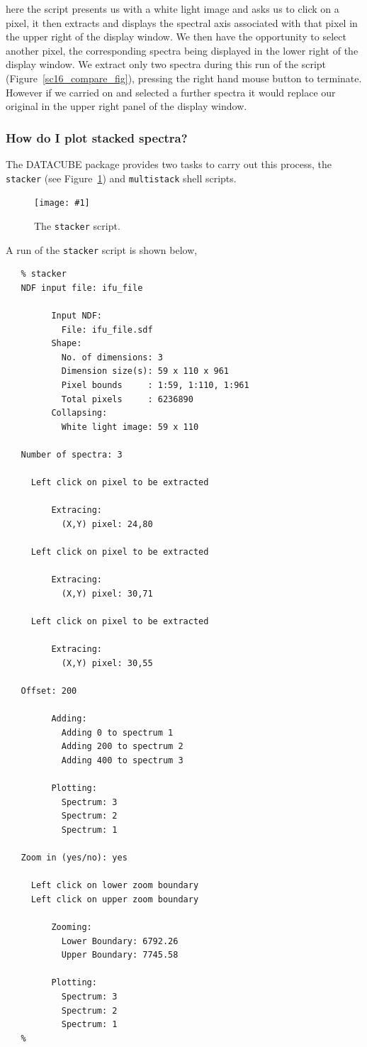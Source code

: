 \documentclass[twoside,11pt]{article}
\newcommand{\htmladdimg}[1]{}
\newcommand{\xref}[3]{#1}
\newcommand{\myfig} [5] {
  \begin{figure}
    \centering\texttt{[image: \#1]}
    \typeout{#1 inserted on page \arabic{page}}
    \caption{\label{#4}#5}
  \end{figure}
  }
\newcommand{\myfig}[5]{
    \label{#4} \htmladdimg{#3}\\
    Figure: #5\\
    }
\begin{document}
here the script presents us with a white light image and asks us to click on a pixel, it then extracts and displays the spectral axis associated with that pixel in the upper right of the display window. We then have the opportunity to select another pixel, the corresponding spectra being displayed in the lower right of the display window. We extract only two spectra during this run of the script (Figure~\ref{sc16_compare_fig}), pressing the right hand mouse button to terminate. However if we carried on and selected a further spectra it would replace our original in the upper right panel of the display window.

\subsubsection{How do I plot stacked spectra?}

The DATACUBE package provides two tasks to carry out this process, the \xref{{\tt stacker}}{sun237}{stacker} (see Figure~\ref{sc16_stacker_fig}) and \xref{{\tt multistack}}{sun237}{multistack} shell scripts.

\myfig{sc16_stacker.eps}{height=0.4\textheight}{sc16_stacker_anim.gif}{sc16_stacker_fig}{The {\tt stacker} script.} 

A run of the {\tt stacker} script is shown below,
 
\small\begin{verbatim}
   % stacker
   NDF input file: ifu_file
 
         Input NDF:
           File: ifu_file.sdf
         Shape:
           No. of dimensions: 3
           Dimension size(s): 59 x 110 x 961
           Pixel bounds     : 1:59, 1:110, 1:961
           Total pixels     : 6236890
         Collapsing:
           White light image: 59 x 110
 
   Number of spectra: 3
 
     Left click on pixel to be extracted
 
         Extracing:
           (X,Y) pixel: 24,80
 
     Left click on pixel to be extracted
 
         Extracing:
           (X,Y) pixel: 30,71
 
     Left click on pixel to be extracted
 
         Extracing:
           (X,Y) pixel: 30,55
 
   Offset: 200
 
         Adding:
           Adding 0 to spectrum 1
           Adding 200 to spectrum 2
           Adding 400 to spectrum 3
 
         Plotting:
           Spectrum: 3 
           Spectrum: 2 
           Spectrum: 1 
 
   Zoom in (yes/no): yes
 
     Left click on lower zoom boundary
     Left click on upper zoom boundary
 
         Zooming:
           Lower Boundary: 6792.26
           Upper Boundary: 7745.58
 
         Plotting:
           Spectrum: 3 
           Spectrum: 2 
           Spectrum: 1 
   %
\end{verbatim}\normalsize
\end{document}
